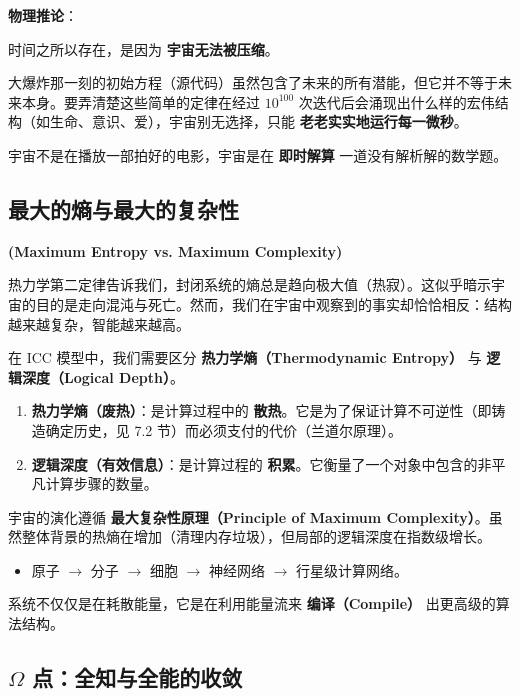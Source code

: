 \textbf{物理推论}：

时间之所以存在，是因为 \textbf{宇宙无法被压缩}。

大爆炸那一刻的初始方程（源代码）虽然包含了未来的所有潜能，但它并不等于未来本身。要弄清楚这些简单的定律在经过 $10^{100}$ 次迭代后会涌现出什么样的宏伟结构（如生命、意识、爱），宇宙别无选择，只能 \textbf{老老实实地运行每一微秒}。

宇宙不是在播放一部拍好的电影，宇宙是在 \textbf{即时解算} 一道没有解析解的数学题。

\subsection{最大的熵与最大的复杂性}

\textbf{(Maximum Entropy vs. Maximum Complexity)}

热力学第二定律告诉我们，封闭系统的熵总是趋向极大值（热寂）。这似乎暗示宇宙的目的是走向混沌与死亡。然而，我们在宇宙中观察到的事实却恰恰相反：结构越来越复杂，智能越来越高。

在 ICC 模型中，我们需要区分 \textbf{热力学熵（Thermodynamic Entropy）} 与 \textbf{逻辑深度（Logical Depth）}。

\begin{enumerate}
\item \textbf{热力学熵（废热）}：是计算过程中的 \textbf{散热}。它是为了保证计算不可逆性（即铸造确定历史，见 7.2 节）而必须支付的代价（兰道尔原理）。

\item \textbf{逻辑深度（有效信息）}：是计算过程的 \textbf{积累}。它衡量了一个对象中包含的非平凡计算步骤的数量。
\end{enumerate}

\begin{corollary}[复杂性引力]
宇宙的演化遵循 \textbf{最大复杂性原理（Principle of Maximum Complexity）}。虽然整体背景的热熵在增加（清理内存垃圾），但局部的逻辑深度在指数级增长。

\begin{itemize}
\item 原子 $\to$ 分子 $\to$ 细胞 $\to$ 神经网络 $\to$ 行星级计算网络。
\end{itemize}

系统不仅仅是在耗散能量，它是在利用能量流来 \textbf{编译（Compile）} 出更高级的算法结构。
\end{corollary}

\subsection{$\Omega$ 点：全知与全能的收敛}

